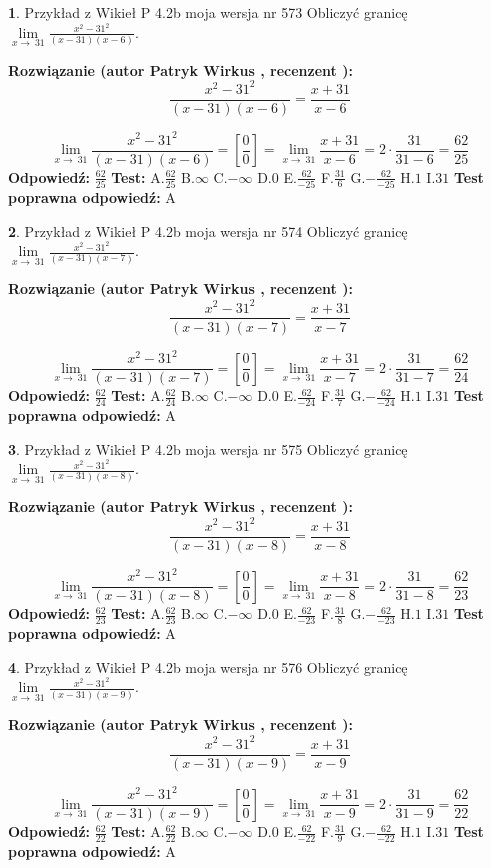 \documentclass[12pt, a4paper]{article}
\theoremstyle{definition} %
\newtheorem{zad}{}
\newcommand{\zadStart}[1]{\begin{zad}#1\newline}
\newcommand{\zadStop}{\end{zad}}
\newcommand{\rozwStart}[2]{\noindent \textbf{Rozwiązanie (autor #1 , recenzent #2): }\newline}
\newcommand{\rozwStop}{\newline}
\newcommand{\odpStart}{\noindent \textbf{Odpowiedź:}\newline}
\newcommand{\odpStop}{\newline}
\newcommand{\testStart}{\noindent \textbf{Test:}\newline}
\newcommand{\testStop}{\newline}
\newcommand{\kluczStart}{\noindent \textbf{Test poprawna odpowiedź:}\newline}
\newcommand{\kluczStop}{\newline}
\begin{document}
\zadStart{Przykład z Wikieł P 4.2b moja wersja nr 573}
Obliczyć granicę $\lim\limits_{x\to\ 31}\frac{x^{2}-31^{2}}{(x-31)(x-6)}$.
\zadStop
\rozwStart{Patryk Wirkus}{}
$$\frac{x^{2}-31^{2}}{(x-31)(x-6)}=\frac{x+31}{x-6}$$

$$\lim\limits_{x\to\ 31}\frac{x^{2}-31^{2}}{(x-31)(x-6)}=[\frac{0}{0}]=\lim\limits_{x\to\ 31}\frac{x+31}{x-6}=2 \cdot \frac{31}{31-6} = \frac{62}{25}$$
\rozwStop
\odpStart
$\frac{62}{25}$
\odpStop
\testStart
A.$\frac{62}{25}$
B.$\infty$
C.$-\infty$
D.$0$
E.$\frac{62}{-25}$
F.$\frac{31}{6}$
G.$-\frac{62}{-25}$
H.$1$
I.$31$
\testStop
\kluczStart
A
\kluczStop



\zadStart{Przykład z Wikieł P 4.2b moja wersja nr 574}
Obliczyć granicę $\lim\limits_{x\to\ 31}\frac{x^{2}-31^{2}}{(x-31)(x-7)}$.
\zadStop
\rozwStart{Patryk Wirkus}{}
$$\frac{x^{2}-31^{2}}{(x-31)(x-7)}=\frac{x+31}{x-7}$$

$$\lim\limits_{x\to\ 31}\frac{x^{2}-31^{2}}{(x-31)(x-7)}=[\frac{0}{0}]=\lim\limits_{x\to\ 31}\frac{x+31}{x-7}=2 \cdot \frac{31}{31-7} = \frac{62}{24}$$
\rozwStop
\odpStart
$\frac{62}{24}$
\odpStop
\testStart
A.$\frac{62}{24}$
B.$\infty$
C.$-\infty$
D.$0$
E.$\frac{62}{-24}$
F.$\frac{31}{7}$
G.$-\frac{62}{-24}$
H.$1$
I.$31$
\testStop
\kluczStart
A
\kluczStop



\zadStart{Przykład z Wikieł P 4.2b moja wersja nr 575}
Obliczyć granicę $\lim\limits_{x\to\ 31}\frac{x^{2}-31^{2}}{(x-31)(x-8)}$.
\zadStop
\rozwStart{Patryk Wirkus}{}
$$\frac{x^{2}-31^{2}}{(x-31)(x-8)}=\frac{x+31}{x-8}$$

$$\lim\limits_{x\to\ 31}\frac{x^{2}-31^{2}}{(x-31)(x-8)}=[\frac{0}{0}]=\lim\limits_{x\to\ 31}\frac{x+31}{x-8}=2 \cdot \frac{31}{31-8} = \frac{62}{23}$$
\rozwStop
\odpStart
$\frac{62}{23}$
\odpStop
\testStart
A.$\frac{62}{23}$
B.$\infty$
C.$-\infty$
D.$0$
E.$\frac{62}{-23}$
F.$\frac{31}{8}$
G.$-\frac{62}{-23}$
H.$1$
I.$31$
\testStop
\kluczStart
A
\kluczStop



\zadStart{Przykład z Wikieł P 4.2b moja wersja nr 576}
Obliczyć granicę $\lim\limits_{x\to\ 31}\frac{x^{2}-31^{2}}{(x-31)(x-9)}$.
\zadStop
\rozwStart{Patryk Wirkus}{}
$$\frac{x^{2}-31^{2}}{(x-31)(x-9)}=\frac{x+31}{x-9}$$

$$\lim\limits_{x\to\ 31}\frac{x^{2}-31^{2}}{(x-31)(x-9)}=[\frac{0}{0}]=\lim\limits_{x\to\ 31}\frac{x+31}{x-9}=2 \cdot \frac{31}{31-9} = \frac{62}{22}$$
\rozwStop
\odpStart
$\frac{62}{22}$
\odpStop
\testStart
A.$\frac{62}{22}$
B.$\infty$
C.$-\infty$
D.$0$
E.$\frac{62}{-22}$
F.$\frac{31}{9}$
G.$-\frac{62}{-22}$
H.$1$
I.$31$
\testStop
\kluczStart
A
\kluczStop
\end{document}

